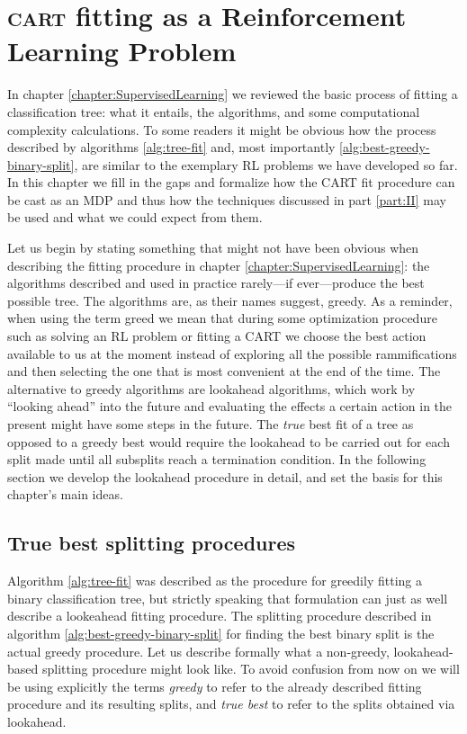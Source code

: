 \chapter{\textsc{cart} fitting as a Reinforcement Learning Problem}
\label{chapter:CARTasRLP}

In chapter \ref{chapter:SupervisedLearning} we reviewed the basic process of
fitting a classification tree: what it entails, the algorithms, and some
computational complexity calculations. To some readers it might be obvious how
the process described by algorithms \ref{alg:tree-fit} and, most importantly
\ref{alg:best-greedy-binary-split}, are similar to the exemplary RL problems we
have developed so far. In this chapter we fill in the gaps and formalize how
the CART fit procedure can be cast as an MDP and thus how the techniques
discussed in part \ref{part:II} may be used and what we could expect from them.

Let us begin by stating something that might not have been obvious when
describing the fitting procedure in chapter \ref{chapter:SupervisedLearning}:
the algorithms described and used in practice rarely---if ever---produce the
best possible tree. The algorithms are, as their names suggest, greedy. As a
reminder, when using the term greed we mean that during some optimization
procedure such as solving an RL problem or fitting a CART we choose the best
action available to us at the moment instead of exploring all the possible
rammifications and then selecting the one that is most convenient at the end of
the time. The alternative to greedy algorithms are lookahead algorithms, which
work by ``looking ahead'' into the future and evaluating the effects a certain
action in the present might have some steps in the future. The \emph{true} best
fit of a tree as opposed to a greedy best would require the lookahead to be
carried out for each split made until all subsplits reach a termination
condition. In the following section we develop the lookahead procedure in
detail, and set the basis for this chapter's main ideas.

\section{True best splitting procedures}

Algorithm \ref{alg:tree-fit} was described as the procedure for greedily fitting
a binary classification tree, but strictly speaking that formulation can just as
well describe a lookeahead fitting procedure. The splitting procedure described
in algorithm \ref{alg:best-greedy-binary-split} for finding the best binary
split is the actual greedy procedure. Let us describe formally what a
non-greedy, lookahead-based splitting procedure might look like. To avoid
confusion from now on we will be using explicitly the terms \emph{greedy} to
refer to the already described fitting procedure and its resulting splits, and
\emph{true best} to refer to the splits obtained via lookahead. 

